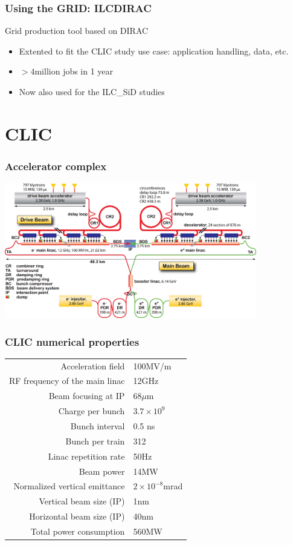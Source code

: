 \documentclass{beamer}
\begin{document}
\begin{frame}
\frametitle{Using the GRID: ILCDIRAC}
Grid production tool based on DIRAC
\begin{itemize}
  \item Extented to fit the CLIC study use case: application handling, data,
  etc.
  \item $>4$million jobs in 1 year
  \item Now also used for the ILC\_SiD studies
\end{itemize}
\end{frame}

\section{CLIC}
\begin{frame}
\frametitle{Accelerator complex}
\includegraphics[width=11cm]{cliccomplex.png}
\end{frame}
\begin{frame}
\frametitle{CLIC numerical properties}
\begin{center}
\begin{tabular}{rl}
Acceleration field & 100MV/m\\
RF frequency of the main linac & 12GHz\\
Beam focusing at IP & 68$\mu$m\\
Charge per bunch & $3.7\times10^9$\\
Bunch interval & 0.5 ns\\
Bunch per train & 312\\
Linac repetition rate & 50Hz\\
Beam power & 14MW\\
Normalized vertical emittance & $2\times10^{-8}$mrad\\
Vertical beam size (IP) & 1nm\\
Horizontal beam size (IP) & 40nm\\
Total power consumption & 560MW
\end{tabular}
\end{center}
\end{frame}
\end{document}
